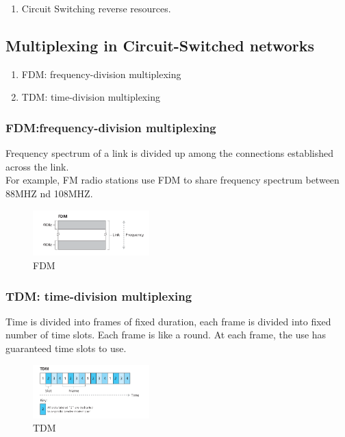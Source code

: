 \begin{enumerate}
    \item Circuit Switching reverse resources.
\end{enumerate}

\subsection{Multiplexing in Circuit-Switched networks}

\begin{enumerate}
    \item FDM: frequency-division multiplexing
    \item TDM: time-division multiplexing
\end{enumerate}

\subsubsection{FDM:frequency-division multiplexing}

Frequency spectrum of a link is divided up among the connections established across the link. \\
For example, FM radio stations use FDM to share frequency spectrum between 88MHZ nd 108MHZ.

\begin{figure}[!h]
    \centering
    \includegraphics[width=0.4\textwidth]{chapters/chapter1/FDM.png}
    \caption{FDM}
    \label{c1_FDM}
\end{figure}


\subsubsection{TDM: time-division multiplexing}

Time is divided into frames of fixed duration, each frame is divided into fixed number of time slots.
Each frame is like a round. At each frame, the use has guaranteed time slots to use.

\begin{figure}[!h]
    \centering
    \includegraphics[width=0.4\textwidth]{chapters/chapter1/TDM.png}
    \caption{TDM}
    \label{c1_TDM}
\end{figure}




